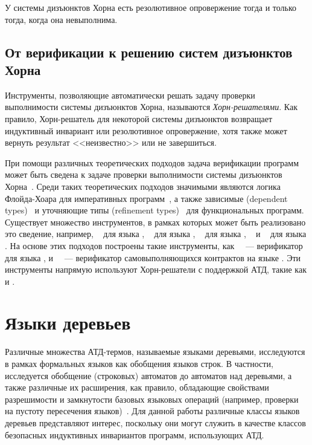 \begin{theorem}
  У системы дизъюнктов Хорна есть резолютивное опровержение тогда и только тогда, когда она невыполнима.
\end{theorem}

\subsection{От верификации к решению систем дизъюнктов Хорна}
Инструменты, позволяющие автоматически решать задачу проверки выполнимости системы дизъюнктов Хорна, называются \emph{Хорн-решателями}. Как правило, Хорн-решатель для некоторой системы дизъюнктов возвращает индуктивный инвариант или резолютивное опровержение, хотя также может вернуть результат <<неизвестно>> или не завершиться.

При помощи различных теоретических подходов задача верификации программ может быть сведена к задаче проверки выполнимости системы дизъюнктов Хорна~\cite{10.1145/2254064.2254112,Bjorner2015}.
Среди таких теоретических подходов значимыми являются логика Флойда-Хоара для императивных программ~\cite{Floyd1993,10.1145/363235.363259}, а также зависимые (dependent types)~\cite{10.1145/292540.292560} и уточняющие типы (refinement types)~\cite{713327} для функциональных программ.
Существует множество инструментов, в рамках которых может быть реализовано это сведение, например, \liquidHaskell{}~\cite{10.1145/2692915.2628161} для языка \haskell{}, \rcaml{}~\cite{10.1007/978-3-319-63390-9_30} для языка \ocaml{}, \flux{}~\cite{https://doi.org/10.48550/arxiv.2207.04034} для языка \rust{}, \leon{}~\cite{10.1007/978-3-642-23702-7_23} и \stainless{}~\cite{10.1145/3360592} для языка \scala{}.
На основе этих подходов построены такие инструменты, как \rustHorn{}~\cite{10.1145/3462205}~--- верификатор для языка \rust{}, и \solCMC{}~\cite{10.1007/978-3-031-13185-1_16}~--- верификатор самовыполняющихся контрактов на языке \solidity{}. Эти инструменты напрямую используют Хорн-решатели с поддержкой АТД, такие как \spacer{} и \eldarica{}.

\section{Языки деревьев}\label{sec:background/treeLangs}
Различные множества АТД-термов, называемые языками деревьями, исследуются в рамках формальных языков как обобщения языков строк.
В частности, исследуется обобщение (строковых) автоматов до автоматов над деревьями, а также различные их расширения, как правило, обладающие свойствами разрешимости и замкнутости базовых языковых операций (например, проверки на пустоту пересечения языков)~\cite{chabin2007visibly, gouranton2001synchronized, limet2001weakly, chabin2006synchronized, jacquemard2009rigid, engelfriet2017multiple}.
Для данной работы различные классы языков деревьев представляют интерес, поскольку они могут служить в качестве классов безопасных индуктивных инвариантов программ, использующих АТД.

